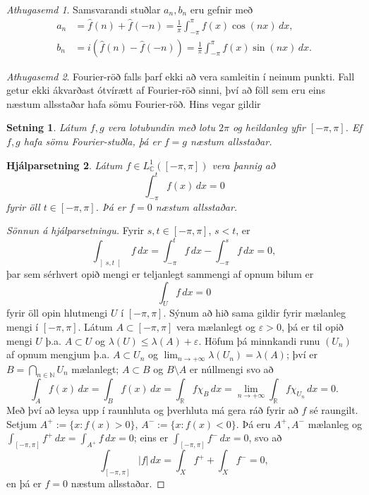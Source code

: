 \documentclass[a4paper,icelandic,11pt]{book}
\theoremstyle{plain}      \newtheorem{setn}{Setning}[chapter]
\newtheorem{lemma}[setn]{Hjálparsetning}
\theoremstyle{definition} \newtheorem{skilgr}[setn]{Skilgreining}
\theoremstyle{remark}     \newtheorem*{ath}{Athugasemd}
\newcommand{\R}{\mathbb R}
\newcommand{\C}{\mathbb C}
\newcommand{\N}{\mathbb N}
\begin{document}
\begin{ath}
  Samsvarandi stuðlar $a_{n},b_{n}$ eru gefnir með
  \begin{align*}
    a_{n}
    &=
    \hat f(n) + \hat f(-n)
    = \frac 1\pi\int_{-\pi}^{\pi} f(x)\cos(nx)\,dx,
    \\
    b_{n}
    &= i(\hat f(n) - \hat f(-n))
    = \frac 1\pi\int_{-\pi}^{\pi} f(x)\sin(nx)\,dx.
  \end{align*}
\end{ath}
\begin{ath}
  Fourier-röð falls þarf ekki að vera samleitin í neinum punkti. Fall
  getur ekki ákvarðast ótvírætt af Fourier-röð sinni, því að föll sem
  eru eins næstum allsstaðar hafa sömu Fourier-röð. Hins vegar gildir
\end{ath}
\begin{setn}
  \label{setn:fourier-nas}
  Látum $f,g$ vera lotubundin með lotu $2\pi$ og heildanleg yfir
  $[-\pi,\pi]$. Ef $f,g$ hafa sömu Fourier-stuðla, þá er $f=g$ næstum
  allsstaðar.
\end{setn}
\begin{lemma}
  Látum $f\in L_{\C}^{1}([-\pi,\pi])$ vera þannig að 
  \[
  \int_{-\pi}^{t}f(x)\,dx = 0
  \]
  fyrir öll $t\in[-\pi,\pi]$. Þá er $f=0$ næstum allsstaðar.
\end{lemma}
\begin{proof}
  [Sönnun á hjálparsetningu]
  Fyrir $s,t\in[-\pi,\pi]$, $s<t$, er 
  \[
  \int_{\left]s,t\right[}f\,dx
  = \int_{-\pi}^{t}f\,dx - \int_{-\pi}^{s}f\,dx
  = 0,
  \]
  þar sem sérhvert opið mengi er teljanlegt sammengi af opnum bilum er 
  \[
  \int_{U}f\,dx = 0
  \]
  fyrir öll opin hlutmengi $U$ í $[-\pi,\pi]$. Sýnum að hið sama
  gildir fyrir mælanleg mengi í $[-\pi,\pi]$. Látum
  $A\subset[-\pi,\pi]$ vera mælanlegt og $\varepsilon > 0$, þá er til
  opið mengi $U$ þ.a. $A\subset U$ og $\lambda(U)\le\lambda(A) +
  \varepsilon$. Höfum þá minnkandi runu $(U_{n})$ af opnum mengjum
  þ.a. $A\subset U_{n}$ og
  $\lim_{n\to+\infty}\lambda(U_{n})=\lambda(A)$; því er
  $B=\bigcap_{n\in\N}U_{n}$ mælanlegt; $A\subset B$ og $B\setminus A$
  er núllmengi svo að 
  \[
  \int_{A}f(x)\,dx
  = \int_{B} f(x)\,dx
  = \int_{\R} f\chi_{B}\,dx
  = \lim_{n\to +\infty}\int_{\R} f\chi_{U_{n}}\,dx
  = 0.
  \]
  Með því að leysa upp í raunhluta og þverhluta má gera ráð fyrir að
  $f$ sé raungilt. Setjum $A^{+} := \{x : f(x) > 0\}$, $A^{-} := \{x :
  f(x) <0 \}$. Þá eru $A^{+},A^{-}$ mælanleg og
  $\int_{[-\pi,\pi]}f^{+}\,dx=\int_{A^{+}}f\,dx = 0$; eins er
  $\int_{[-\pi,\pi]}f^{-}\,dx = 0$, svo að 
  \[
  \int_{[-\pi,\pi]}|f|\,dx
  = \int_{X}f^{+}+\int_{X}f^{-}
  = 0,
  \]
  en þá er $f=0$ næstum allsstaðar.
\end{proof}
\end{document}
